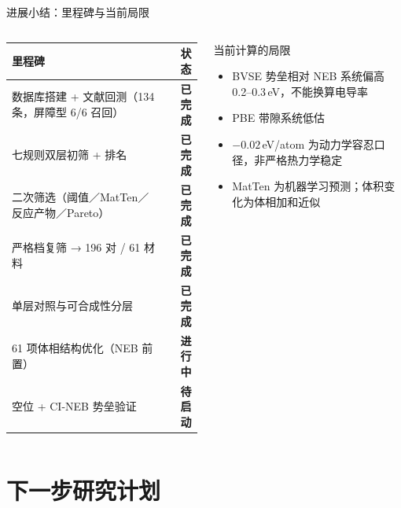 \documentclass[aspectratio=169,10pt]{beamer}
\newcommand{\done}{{\color{NJUCalloutGreen}\bfseries 已完成}}
\newcommand{\doing}{{\color{NJUCalloutGold}\bfseries 进行中}}
\newcommand{\todo}{{\color{NJUMuted}\bfseries 待启动}}
\begin{document}
\begin{frame}[t]{进展小结：里程碑与当前局限}
\begin{columns}[T,onlytextwidth]
  \begin{column}{.55\textwidth}
    {\fontsize{8.3}{10.8}\selectfont\renewcommand{\arraystretch}{1.22}
    \begin{tabular}{@{}L{.76\linewidth}r@{}}
      \toprule
      里程碑 & 状态 \\
      \midrule
      数据库搭建 + 文献回测（134 条，屏障型 6/6 召回） & \done \\
      七规则双层初筛 + 排名 & \done \\
      二次筛选（阈值／MatTen／反应产物／Pareto） & \done \\
      严格档复筛 → 196 对 / 61 材料 & \done \\
      单层对照与可合成性分层 & \done \\
      61 项体相结构优化（NEB 前置） & \doing \\
      空位 + CI-NEB 势垒验证 & \todo \\
      \bottomrule
    \end{tabular}}
  \end{column}
  \begin{column}{.42\textwidth}
    \begin{njuquotered}{当前计算的局限}
      \begin{itemize}
        \item BVSE 势垒相对 NEB 系统偏高 0.2–0.3\,eV，不能换算电导率
        \item PBE 带隙系统低估
        \item $-0.02$\,eV/atom 为动力学容忍口径，非严格热力学稳定
        \item MatTen 为机器学习预测；体积变化为体相加和近似
      \end{itemize}
    \end{njuquotered}
  \end{column}
\end{columns}
\end{frame}

\section{下一步研究计划}
\end{document}
